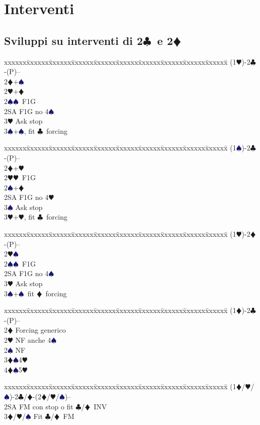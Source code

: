 \documentclass[a4paper,italian]{article}
\newcommand{\BC}{\textcolor{OliveGreen}{$\clubsuit$}}
\newcommand{\BD}{\textcolor{RedOrange}{$\vardiamondsuit$}}
\newcommand{\BH}{\textcolor{Red2}{$\varheartsuit${}}}
\newcommand{\BS}{\textcolor{MidnightBlue}{$\spadesuit${}}}
\newcommand{\pdfc}{\texorpdfstring{\BC{}}{C}}
\newcommand{\pdfd}{\texorpdfstring{\BD{}}{D}}
\newenvironment{bidtable}
{\begin{tabbing}

    xxxxxx\=xxxxxx\=xxxxxx\=xxxxxx\=xxxxxx\=xxxxxx\=xxxxxx\=xxxxxx\=xxxxxx\=xxxxxx\=\kill}
{\end{tabbing} }%
\begin{document}
\section{Interventi}

\begin{multicols}{2}

    \subsection{Sviluppi su interventi di 2\pdfc\ e 2\pdfd}

    \begin{bidtable}
        (1\BH)-2\BC-(P)--\+\\
        2\BD {}+\BS\\
        2\BH {}+\BD \\
        2\BS {}\BS\ F1G\\
        2SA \> F1G no 4\BS\\
        3\BH \> Ask stop\\
        3\BS {}+\BS, fit \BC\ forcing
    \end{bidtable}
    \begin{bidtable}
        (1\BS)-2\BC-(P)--\+\\
        2\BD {}+\BH\\
        2\BH {}\BH\ F1G\\
        2\BS {}+\BD \\
        2SA \> F1G no 4\BH\\
        3\BS \> Ask stop\\
        3\BH {}+\BH, fit \BC\ forcing
    \end{bidtable}

    \begin{bidtable}
        (1\BH)-2\BD-(P)--\+\\
        2\BH {}\BS \\
        2\BS {}\BS\ F1G\\
        2SA \> F1G no 4\BS \\
        3\BH \> Ask stop\\
        3\BS {}+\BS\ fit \BD\ forcing
    \end{bidtable}
    \begin{bidtable}
        (1\BD)-2\BC-(P)--\+\\
        2\BD \> Forcing generico\\
        2\BH \> NF anche 4\BS \\
        2\BS \> NF\\
        3\BD {}\BS 4\BH \\
        4\BD {}\BS 5\BH
    \end{bidtable}
    \begin{bidtable}
        (1\BD/\BH/\BS)-2\BC/\BD-(2\BD/\BH/\BS)--\+\\
        2SA \> FM con stop o fit \BC/\BD\ INV\\
        3\BD/\BH/\BS \> Fit \BC/\BD\ FM\\
    \end{bidtable}


\end{multicols}
\end{document}
